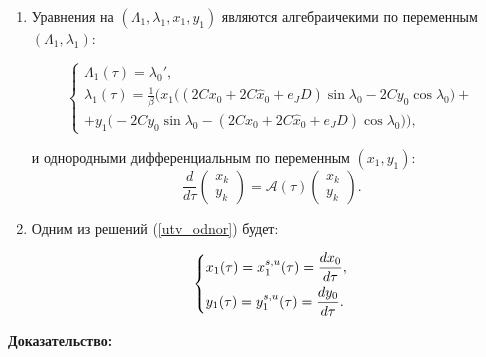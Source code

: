 \begin{utv}
\begin{enumerate}

    \item Уравнения на $(\Lambda_1,\lambda_1,x_1,y_1)$ являются алгебраичекими по переменным $(\Lambda_1,\lambda_1)$:
    
\begin{equation*}
    \begin{cases}
        \Lambda_1(\tau) = \lambda_{0}', \\
        
        \lambda_1(\tau) = \frac1\beta \Big(x_1 \big( (2Cx_0+2C \hat x_0+e_JD) \sin\lambda_0 - 2Cy_0 \cos\lambda_0 \big) + \\
        +y_1 \big( -2Cy_0 \sin\lambda_0 - (2Cx_0+2C \hat x_0+e_JD) \cos\lambda_0 \big) \Big),
    \end{cases}
\end{equation*}

и однородными дифференциальным по переменным $(x_1,y_1)$:
\begin{equation}
\frac{d}{d\tau} \begin{pmatrix} x_k \\ y_k \end{pmatrix} = \mathcal{A}(\tau) \begin{pmatrix} x_k \\ y_k \end{pmatrix}.
\label{utv_odnor}
\end{equation}

    \item Одним из решений (\ref{utv_odnor}) будет:
    
\begin{equation}
    \begin{dcases}
        x_1(\tau)=x_1^{s,u}(\tau)=\frac{dx_0}{d \tau}, \\
        y_1(\tau)=y_1^{s,u}(\tau)=\frac{dy_0}{d \tau}. \\
    \end{dcases}
\end{equation}

\end{enumerate}
\end{utv}

\textbf{Доказательство:}\nopagebreak[4]

